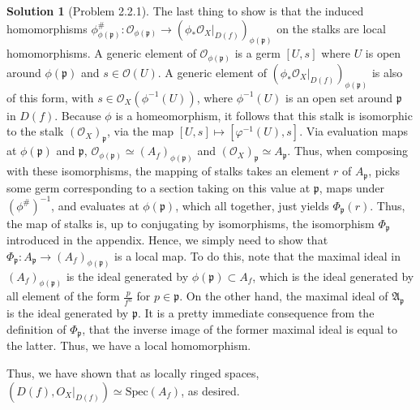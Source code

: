 \documentclass[aps,pra,showpacs,notitlepage,onecolumn,superscriptaddress,nofootinbib]{revtex4-1}
\theoremstyle{definition}
\newtheorem{solution}{Solution}[section]
\begin{document}
\begin{solution}[Problem 2.2.1]
  \noindent The last thing to show is that the induced homomorphisms $\phi^{\#}_{\phi(\mathfrak{p})} : \mathcal{O}_{\phi(\mathfrak{p})} \rightarrow (\phi_{*} \mathcal{O}_X|_{D(f)})_{\phi(\mathfrak{p})}$ on the stalks are local homomorphisms.
  A generic element of $\mathcal{O}_{\phi(\mathfrak{p})}$ is a germ $[U, s]$ where $U$ is open around $\phi(\mathfrak{p})$ and $s \in \mathcal{O}(U)$. A generic element of $(\phi_{*} \mathcal{O}_X|_{D(f)})_{\phi(\mathfrak{p})}$ is also
  of this form, with $s \in \mathcal{O}_X(\phi^{-1}(U))$, where $\phi^{-1}(U)$ is an open set around $\mathfrak{p}$ in $D(f)$. Because $\phi$ is a homeomorphism, it follows that this stalk is isomorphic to the stalk
  $(\mathcal{O}_X)_{\mathfrak{p}}$, via the map $[U, s] \mapsto [\varphi^{-1}(U), s]$. Via evaluation maps at $\phi(\mathfrak{p})$ and $\mathfrak{p}$, $\mathcal{O}_{\phi(\mathfrak{p})} \simeq (A_f)_{\phi(\mathfrak{p})}$ and
  $(\mathcal{O}_X)_{\mathfrak{p}} \simeq A_{\mathfrak{p}}$. Thus, when composing with these isomorphisms, the mapping of stalks takes an element $r$ of $A_{\mathfrak{p}}$, picks some germ corresponding to a
  section taking on this value at $\mathfrak{p}$, maps under $(\phi^{\#})^{-1}$, and evaluates at $\phi(\mathfrak{p})$, which all together, just yields $\Phi_{\mathfrak{p}}(r)$. Thus, the map of stalks is, up to conjugating by isomorphisms,
  the isomorphism $\Phi_{\mathfrak{p}}$ introduced in the appendix. Hence, we simply need to show that $\Phi_{\mathfrak{p}} : A_{\mathfrak{p}} \rightarrow (A_f)_{\phi(\mathfrak{p})}$ is a local map. To do this, note
  that the maximal ideal in $(A_f)_{\phi(\mathfrak{p})}$ is the ideal generated by $\phi(\mathfrak{p}) \subset A_f$, which is the ideal generated by all element of the form $\frac{p}{f^n}$ for $p \in \mathfrak{p}$. On the other hand,
  the maximal ideal of $\mathfrak{A}_{\mathfrak{p}}$ is the ideal generated by $\mathfrak{p}$. It is a pretty immediate consequence from the definition of $\Phi_{\mathfrak{p}}$, that the inverse image of the former
  maximal ideal is equal to the latter. Thus, we have a local homomorphism.
  \newline

  \noindent Thus, we have shown that as locally ringed spaces, $(D(f), O_X|_{D(f)}) \simeq \text{Spec}(A_f)$, as desired.
  \end{solution}
\end{document}
